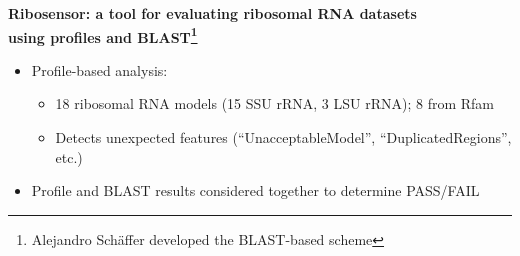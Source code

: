\documentclass[landscape]{slides}
\begin{document}
\begin{slide}
\begin{center}
\textbf{Ribosensor: a tool for evaluating ribosomal RNA datasets \\ using
profiles and BLAST\footnote{Alejandro Sch\"{a}ffer developed the BLAST-based scheme}}
\end{center}


\small
\begin{itemize}
\item Profile-based analysis:
\begin{itemize}
\item 18 ribosomal RNA models (15 SSU rRNA, 3 LSU rRNA); 8 from Rfam
\item Detects unexpected features (``UnacceptableModel'', ``DuplicatedRegions'', etc.)
\end{itemize}

\item Profile and BLAST results considered together to determine PASS/FAIL
\end{itemize}


\vfill
\end{slide}
\end{document}
